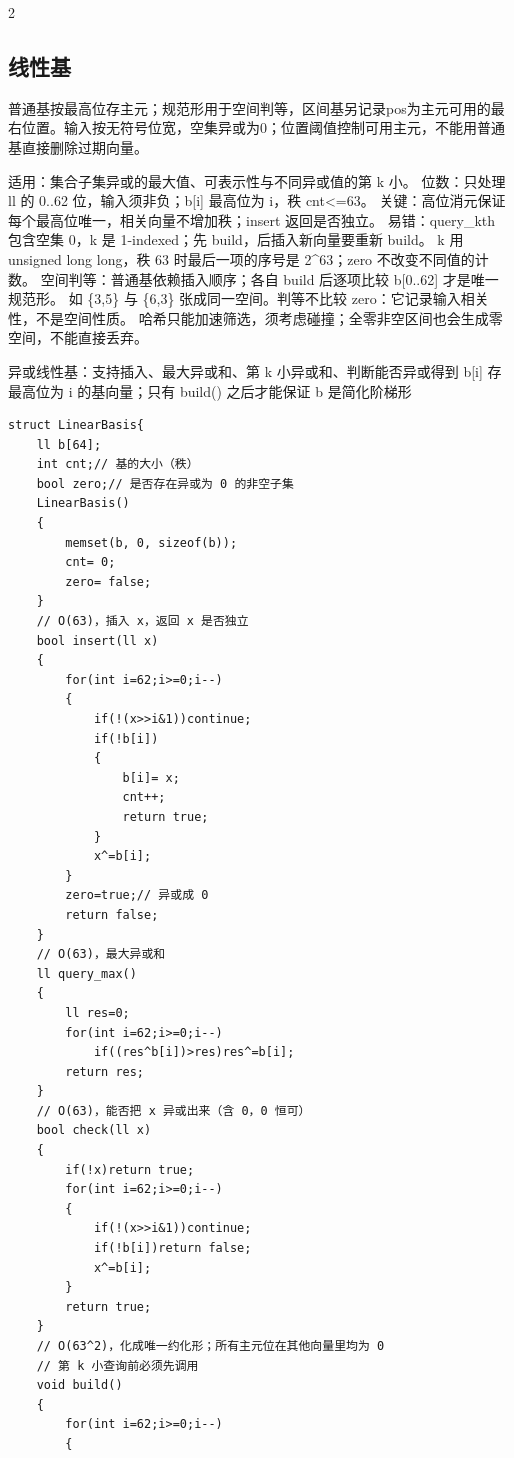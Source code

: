 \documentclass[UTF8,fontset=fandol,a4paper,twoside]{ctexart}
\newcommand{\note}[1]{{\fontsize{10}{12}\selectfont #1\par}}
\begin{document}
\begin{multicols}{2}
\subsection{线性基}

\note{普通基按最高位存主元；规范形用于空间判等，区间基另记录pos为主元可用的最右位置。输入按无符号位宽，空集异或为0；位置阈值控制可用主元，不能用普通基直接删除过期向量。}
\note{适用：集合子集异或的最大值、可表示性与不同异或值的第 k 小。 位数：只处理 ll 的 0.\allowbreak{}.\allowbreak{}62 位，输入须非负；b[\allowbreak{}i]\allowbreak{} 最高位为 i，秩 cnt<\allowbreak{}=\allowbreak{}63。 关键：高位消元保证每个最高位唯一，相关向量不增加秩；insert 返回是否独立。 易错：query\_kth 包含空集 0，k 是 1-\allowbreak{}indexed；先 build，后插入新向量要重新 build。 k 用 unsigned long long，秩 63 时最后一项的序号是 2\textasciicircum{}63；zero 不改变不同值的计数。 空间判等：普通基依赖插入顺序；各自 build 后逐项比较 b[\allowbreak{}0.\allowbreak{}.\allowbreak{}62]\allowbreak{} 才是唯一规范形。 如 \{3,\allowbreak{}5\} 与 \{6,\allowbreak{}3\} 张成同一空间。判等不比较 zero：它记录输入相关性，不是空间性质。 哈希只能加速筛选，须考虑碰撞；全零非空区间也会生成零空间，不能直接丢弃。}
\note{异或线性基：支持插入、最大异或和、第 k 小异或和、判断能否异或得到 b[\allowbreak{}i]\allowbreak{} 存最高位为 i 的基向量；只有 build(\allowbreak{})\allowbreak{} 之后才能保证 b 是简化阶梯形}
\begin{lstlisting}
struct LinearBasis{
    ll b[64];
    int cnt;// 基的大小（秩）
    bool zero;// 是否存在异或为 0 的非空子集
    LinearBasis()
    {
        memset(b, 0, sizeof(b));
        cnt= 0;
        zero= false;
    }
    // O(63)，插入 x，返回 x 是否独立
    bool insert(ll x)
    {
        for(int i=62;i>=0;i--)
        {
            if(!(x>>i&1))continue;
            if(!b[i])
            {
                b[i]= x;
                cnt++;
                return true;
            }
            x^=b[i];
        }
        zero=true;// 异或成 0
        return false;
    }
    // O(63)，最大异或和
    ll query_max()
    {
        ll res=0;
        for(int i=62;i>=0;i--)
            if((res^b[i])>res)res^=b[i];
        return res;
    }
    // O(63)，能否把 x 异或出来（含 0，0 恒可）
    bool check(ll x)
    {
        if(!x)return true;
        for(int i=62;i>=0;i--)
        {
            if(!(x>>i&1))continue;
            if(!b[i])return false;
            x^=b[i];
        }
        return true;
    }
    // O(63^2)，化成唯一约化形；所有主元位在其他向量里均为 0
    // 第 k 小查询前必须先调用
    void build()
    {
        for(int i=62;i>=0;i--)
        {

\end{lstlisting}
\end{multicols}
\end{document}
